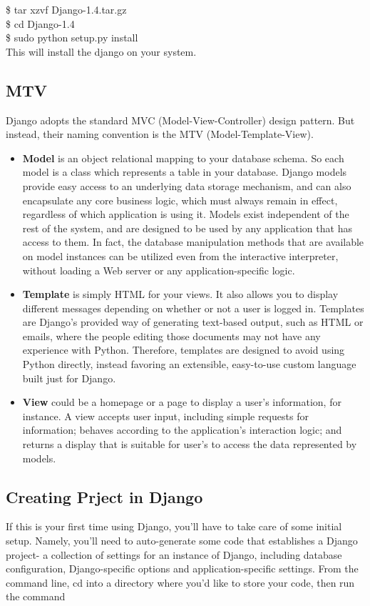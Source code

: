 	\$ tar xzvf Django-1.4.tar.gz\\


	\$ cd Django-1.4\\


	\$ sudo python setup.py install \\

\noindent This will install the django on your system.
 
\noindent \subsection{MTV} Django adopts the standard 
MVC (Model-View-Controller) design pattern. But instead, their naming 
convention is the MTV (Model-Template-View).
\begin{itemize}
\item {\bf{Model}} is an object relational mapping to your 
database schema. So each model is a class which represents a table in 
your database. Django models provide easy access to an underlying data 
storage mechanism, and can also encapsulate any core business logic, 
which must always remain in effect, regardless of which application is 
using it. Models exist independent of the rest of the system, and are 
designed to be used by any application that has access to them. In 
fact, the database manipulation methods that are available on model 
instances can be utilized even from the interactive interpreter, 
without loading a Web server or any application-specific logic.

\item {\bf{Template}} is simply HTML for your views. It also 
allows you to display different messages depending on whether or not a 
user is logged in. Templates are Django's provided way of generating 
text-based output, such as HTML or emails, where the people editing 
those documents may not have any experience with Python. Therefore, 
templates are designed to avoid using Python directly, instead favoring 
an extensible, easy-to-use custom language built just for Django.

\item {\bf{View}} could be a homepage or a page to display a 
user's information, for instance. A view accepts user input, including 
simple requests for information; behaves according to the application's 
interaction logic; and returns a display that is suitable for user's to 
access the data represented by models.
\end{itemize}
\subsection{Creating Prject in Django}
If this is your first time using Django, you'll have to take care of 
some initial setup. Namely, you'll need to auto-generate some code that 
establishes a Django project- a collection of settings for an instance 
of Django, including database configuration, Django-specific options 
and application-specific settings. From the command line, cd into a 
directory where you'd like to store your code, then run the command \\

